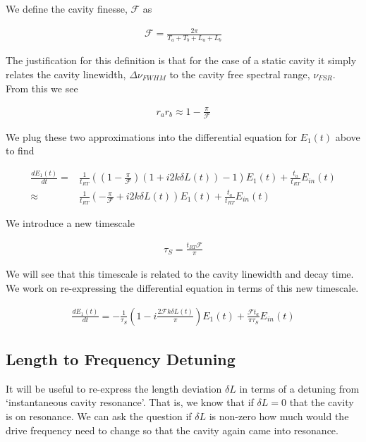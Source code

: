 \documentclass[12pt]{article}
\begin{document}
We define the cavity finesse, $\mathcal{F}$ as

\begin{align}
\mathcal{F} = \frac{2\pi}{T_a+T_b+L_a+L_b}
\end{align}

The justification for this definition is that for the case of a static cavity it simply relates the cavity linewidth, $\Delta\nu_{FWHM}$ to the cavity free spectral range, $\nu_{FSR}$.
From this we see

\begin{align}
r_ar_b \approx 1-\frac{\pi}{\mathcal{F}}
\end{align}

We plug these two approximations into the differential equation for $E_1(t)$ above to find

\begin{align}
\frac{dE_1(t)}{dt} =& \frac{1}{t_{RT}}\left(\left(1-\frac{\pi}{\mathcal{F}}\right)\left(1+i2k\delta L(t)\right) - 1 \right)E_1(t) + \frac{t_a}{t_{RT}} E_{in}(t)\\
\approx& \frac{1}{t_{RT}}\left(-\frac{\pi}{\mathcal{F}} + i2k\delta L(t)\right)E_1(t) + \frac{t_a}{t_{RT}} E_{in}(t)
\end{align}

We introduce a new timescale

\begin{align}
\tau_S = \frac{t_{RT}\mathcal{F}}{\pi}
\end{align}

We will see that this timescale is related to the cavity linewidth and decay time.
We work on re-expressing the differential equation in terms of this new timescale.

\begin{align}
\frac{dE_1(t)}{dt} = -\frac{1}{\tau_S}\left(1 - i\frac{2\mathcal{F}k\delta L(t)}{\pi}\right)E_1(t) + \frac{\mathcal{F}t_a}{\pi\tau_S} E_{in}(t)
\end{align}

\subsection{Length to Frequency Detuning}
It will be useful to re-express the length deviation $\delta L$ in terms of a detuning from `instantaneous cavity resonance'. 
That is, we know that if $\delta L=0$ that the cavity is on resonance.
We can ask the question if $\delta L$ is non-zero how much would the drive frequency need to change so that the cavity again came into resonance. 
\end{document}
